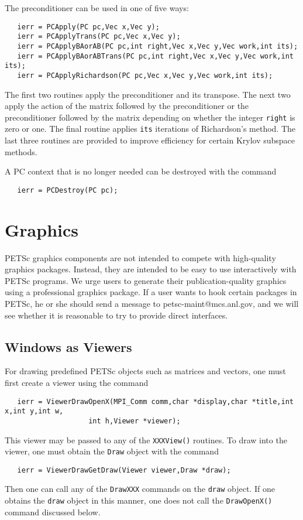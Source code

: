 The preconditioner can be used in one of five ways: 
  
 
\begin{verbatim}
   ierr = PCApply(PC pc,Vec x,Vec y);
   ierr = PCApplyTrans(PC pc,Vec x,Vec y);
   ierr = PCApplyBAorAB(PC pc,int right,Vec x,Vec y,Vec work,int its);
   ierr = PCApplyBAorABTrans(PC pc,int right,Vec x,Vec y,Vec work,int its);
   ierr = PCApplyRichardson(PC pc,Vec x,Vec y,Vec work,int its);
\end{verbatim}
The first two routines apply the preconditioner and its transpose. The 
next two apply the action of the matrix followed by the preconditioner 
or the preconditioner followed by the matrix depending on whether 
the 
integer {\tt right} is zero or one. The final routine applies 
{\tt its} iterations of Richardson's method. The last three routines 
are provided to improve efficiency for certain Krylov subspace methods.

A PC context that is no longer needed can be destroyed with the 
command 
\begin{verbatim}
   ierr = PCDestroy(PC pc);
\end{verbatim}

\chapter{Graphics}
\label{ch:graphics}


PETSc graphics components are not intended to compete with 
high-quality graphics packages.  Instead, they are intended to be 
easy to use interactively with PETSc programs. We urge users
to generate their publication-quality graphics using a
professional graphics package. If a user wants to hook
certain packages in PETSc, he or she should send a message to 
petsc-maint@mcs.anl.gov, and we will see whether it is reasonable
to try to provide direct interfaces.

\section{Windows as Viewers}
For drawing predefined PETSc objects such as matrices and vectors, one must 
first create a viewer using the 
command 
\begin{verbatim}
   ierr = ViewerDrawOpenX(MPI_Comm comm,char *display,char *title,int x,int y,int w,
                    int h,Viewer *viewer);
\end{verbatim}
This viewer may be passed to any of the {\tt XXXView()} routines.
To draw into the viewer, one must obtain the {\tt Draw} object with the
command 
\begin{verbatim}
   ierr = ViewerDrawGetDraw(Viewer viewer,Draw *draw);
\end{verbatim}
Then one can call any of the {\tt DrawXXX} commands on the {\tt draw}
object. If one obtains the {\tt draw} object in this manner, 
one does not call the {\tt DrawOpenX()} command discussed below.

